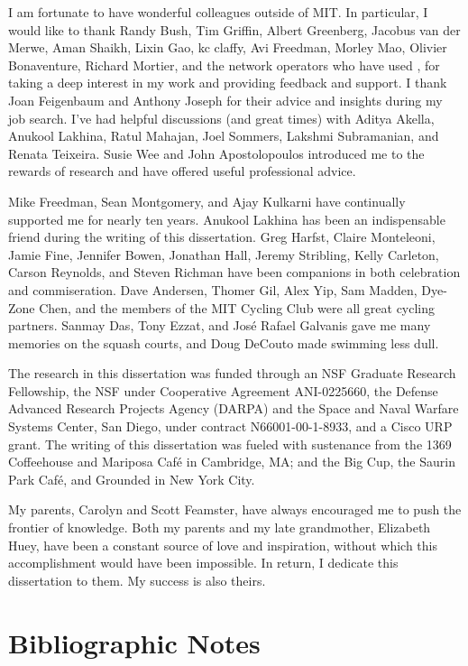 I am fortunate to have wonderful colleagues outside of MIT.  In
particular, I would like to thank Randy Bush, Tim Griffin, Albert
Greenberg, Jacobus van der Merwe, Aman Shaikh, Lixin Gao,
kc claffy, Avi Freedman, Morley Mao, Olivier Bonaventure, Richard
Mortier, and the network operators who have used \rccns, for
taking a deep interest in my work and providing feedback and support.  I
thank Joan Feigenbaum and Anthony Joseph for their advice and insights
during my job search.  I've had helpful discussions (and great times)
with Aditya Akella, Anukool Lakhina, Ratul Mahajan, Joel Sommers,
Lakshmi Subramanian, and Renata Teixeira.  Susie Wee and John
Apostolopoulos introduced me to the rewards of research and have
offered useful professional advice.

Mike Freedman, Sean Montgomery, and Ajay Kulkarni have continually
supported me for nearly ten years.  Anukool Lakhina has been an
indispensable friend during the writing of this dissertation.  Greg
Harfst, Claire Monteleoni, Jamie Fine, Jennifer Bowen, Jonathan Hall,
Jeremy Stribling,
Kelly Carleton, Carson Reynolds, and Steven Richman have been companions
in both celebration and commiseration.  Dave Andersen, Thomer Gil, Alex
Yip, Sam Madden, Dye-Zone Chen, and the members of the MIT Cycling
Club were all great cycling partners.  Sanmay Das, Tony Ezzat,
and Jos\'{e} Rafael Galvanis gave me many memories on the squash courts,
and Doug DeCouto made swimming less dull.

The research in this dissertation was funded through an NSF Graduate
Research Fellowship, the NSF under Cooperative Agreement ANI-0225660,
the Defense Advanced Research Projects Agency (DARPA) and the Space and
Naval Warfare Systems Center, San Diego, under contract
N66001-00-1-8933, and a Cisco URP grant.  The writing of this
dissertation was fueled with sustenance from the 1369 Coffeehouse and
Mariposa Caf\'{e} in Cambridge, MA; and the Big Cup, the Saurin Park
Caf\'{e}, and Grounded in New York City.

My parents, Carolyn and Scott Feamster, 
have always encouraged me to push the frontier of
knowledge.  Both my 
parents and my late grandmother, Elizabeth Huey, have been a constant
source of love and inspiration, without which this accomplishment would
have been impossible.  In return, I dedicate this dissertation to them.
My success is also theirs.



\chapter*{Bibliographic Notes}

